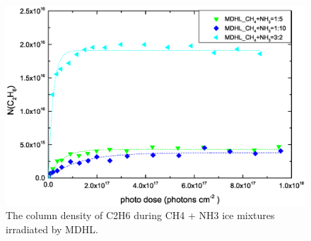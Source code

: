 \begin{figure}
\centering
\includegraphics[width=\textwidth]{figures/chapter3/Lab_C2H6.eps}
\caption{The column density of C2H6 during CH4 + NH3 ice mixtures irradiated by MDHL. }
\label{fig:lab_C2H6}
\end{figure}

